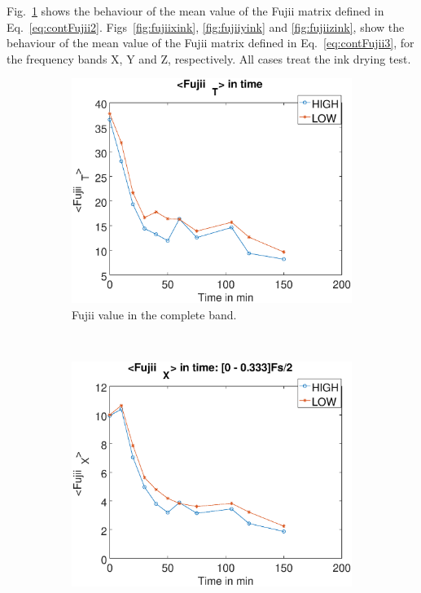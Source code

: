 \documentclass[review]{elsarticle}
\begin{document}
Fig.~\ref{fig:fujiiallink} shows the behaviour of the mean value of the Fujii matrix
defined in Eq.~\ref{eq:contFujii2}.
Figs~\ref{fig:fujiixink}, \ref{fig:fujiiyink} and \ref{fig:fujiizink},
show the behaviour of the mean value of the Fujii matrix defined in Eq.~\ref{eq:contFujii3},
for the frequency bands X, Y and Z, respectively. All cases treat the ink drying test.
\begin{figure}[!h]
    \centering
    \begin{subfigure}[b]{0.475\textwidth}
        \includegraphics[width=\textwidth]{fujii-all.eps}
	\caption{Fujii value in the complete band.}
        \label{fig:fujiiallink}
    \end{subfigure}
    ~
    \begin{subfigure}[b]{0.475\textwidth}
        \includegraphics[width=\textwidth]{fujii-bandx.eps}

\end{subfigure}
\end{figure}
\end{document}
